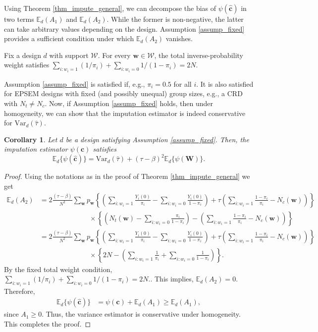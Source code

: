 \documentclass[12pt]{article}
\newcommand{\Var}{{\text{Var}}}
\newcommand{\E}{{\mathbb{E}}}
\newtheorem{corollary}{Corollary}[section]
\begin{document}
Using Theorem \ref{thm_impute_general}, we can decompose the bias of $\psi(\hat{\bm{c}})$ in two terms $\E_d(A_1)$ and $\E_d(A_2)$. While the former is non-negative, the latter can take arbitrary values depending on the design. Assumption \ref{assump_fixed} provides a sufficient condition under which $\E_d(A_2)$ vanishes.
\begin{assumption} \normalfont
    Fix a design $d$ with support $\mathcal{W}$. For every $\bm{w} \in \mathcal{W}$, the total inverse-probability weight satisfies $\sum_{i:w_i = 1}(1/\pi_i) + \sum_{i:w_i = 0}1/(1-\pi_i) = 2N.$ \label{assump_fixed}
\end{assumption}
Assumption \ref{assump_fixed} is satisfied if, e.g., $\pi_i = 0.5$ for all $i$. It is also satisfied for EPSEM designs with fixed (and possibly unequal) group sizes, e.g., a CRD with $N_t \neq N_c$. Now, if Assumption \ref{assump_fixed} holds, then under homogeneity, we can show that the imputation estimator is indeed conservative for $\Var_d(\hat{\tau})$.
\begin{corollary} \normalfont
Let $d$ be a design satisfying Assumption \ref{assump_fixed}. Then, the imputation estimator $\psi(\bm{c})$ satisfies
   $$\E_d\{\psi(\hat{\bm{c}})\} = \Var_d(\hat{\tau}) + (\tau - \beta)^2\E_d\{\psi(\bm{W})\}.$$ \label{corollary_imputation}
\end{corollary}

\begin{proof}
    
Using the notations as in the proof of Theorem \ref{thm_impute_general} we get
\begin{align}
    \E_d(A_2) & = 2\frac{(\tau - \beta)}{N^2}\sum_{\bm{w}}p_{\bm{w}}\left\{ \left(\sum_{i:w_i = 1}\frac{Y_i(0)}{\pi_i} - \sum_{i:w_i = 0}\frac{Y_i(0)}{1-\pi_i} \right) + \tau \left( \sum_{i:w_i = 1}\frac{1-\pi_i}{\pi_i} - N_c(\bm{w}) \right) \right\} \nonumber \\
 & \hspace{3cm} \times \left\{\left(N_t(\bm{w}) - \sum_{i:w_i = 0}\frac{\pi_i}{1-\pi_i}\right) - \left(\sum_{i:w_i = 1}\frac{1-\pi_i}{\pi_i} - N_c(\bm{w}) \right)\right\} \nonumber \\
 & = 2\frac{(\tau - \beta)}{N^2}\sum_{\bm{w}}p_{\bm{w}}\left\{ \left(\sum_{i:w_i = 1}\frac{Y_i(0)}{\pi_i} - \sum_{i:w_i = 0}\frac{Y_i(0)}{1-\pi_i} \right) + \tau \left( \sum_{i:w_i = 1}\frac{1-\pi_i}{\pi_i} - N_c(\bm{w}) \right) \right\} \nonumber \\
 & \hspace{3cm} \times \left\{2N - \left(\sum_{i:w_i = 1}\frac{1}{\pi_i} + \sum_{i:w_i = 0}\frac{1}{1-\pi_i} \right)\right\}.
\end{align}
By the fixed total weight condition, $\sum_{i:w_i = 1}(1/\pi_i) + \sum_{i:w_i = 0}1/(1-\pi_i) = 2N.$. This implies, $\E_d(A_2) = 0$.
Therefore,
\begin{align}
    \E_d\{\psi(\hat{\bm{c}})\} & = \psi(\bm{c}) + \E_d(A_1) \geq \E_d(A_1),
\end{align}
since $A_1 \geq 0$. Thus, the variance estimator is conservative under homogeneity. This completes the proof.
\end{proof}
\end{document}
